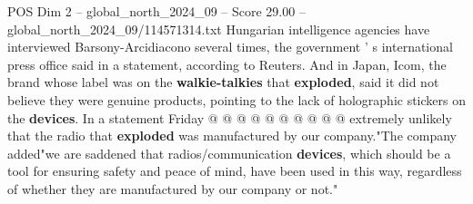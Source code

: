 \begin{textsample}{POS Dim 2 – global\_north\_2024\_09 – Score 29.00 – global\_north\_2024\_09/114571314.txt}
Hungarian intelligence agencies have interviewed Barsony-Arcidiacono several times, the government ' s international press office said in a statement, according to Reuters.
And in Japan, Icom, the brand whose label was on the \textbf{walkie-talkies} that \textbf{exploded}, said it did not believe they were genuine products, pointing to the lack of holographic stickers on the \textbf{devices}.
In a statement Friday @ @ @ @ @ @ @ @ @ @ extremely unlikely that the radio that \textbf{exploded} was manufactured by our company."The company added"we are saddened that radios/communication \textbf{devices}, which should be a tool for ensuring safety and peace of mind, have been used in this way, regardless of whether they are manufactured by our company or not."

\end{textsample}
